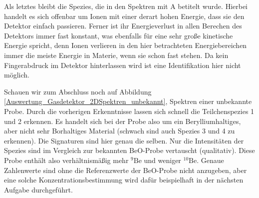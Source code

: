 Als letztes bleibt die Spezies, die in den Spektren mit \glqq A\grqq{} betitelt wurde.
Hierbei handelt es sich offenbar um Ionen mit einer derart hohen Energie, dass sie den Detektor einfach passieren.
Ferner ist ihr Energieverlust in allen Berechen des Detektors immer fast konstant, was ebenfalls für eine sehr große kinetische Energie spricht, denn Ionen verlieren in den hier betrachteten Energiebereichen immer die meiste Energie in Materie, wenn sie schon fast stehen.
Da kein \glqq Fingerabdruck\grqq{} im Detektor hinterlassen wird ist eine Identifikation hier nicht möglich.

Schauen wir zum Abschluss noch auf Abbildung \ref{Auswertung_Gasdetektor_2DSpektren_unbekannt}, Spektren einer unbekannte Probe.
Durch die vorherigen Erkenntnisse lassen sich schnell die Teilchenspezies 1 und 2 erkennen.
Es handelt sich bei der Probe also um ein Berylliumhaltiges, aber nicht sehr Borhaltiges Material (schwach sind auch Spezies 3 und 4 zu erkennen).
Die Signaturen sind hier genau die selben.
Nur die Intensitäten der Spezies sind im Vergleich zur bekannten BeO-Probe vertauscht (qualitativ).
Diese Probe enthält also verhältnismäßig mehr $^{9}\text{Be}$ und weniger $^{10}\text{Be}$.
Genaue Zahlenwerte sind ohne die Referenzwerte der BeO-Probe nicht anzugeben, aber eine solche Konzentrationsbestimmung wird dafür beispielhaft in der nächsten Aufgabe durchgeführt.
